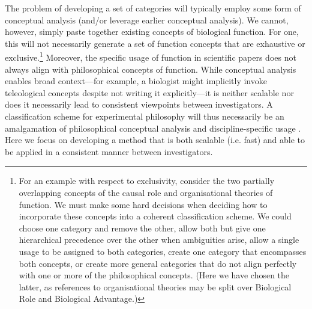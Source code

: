 \documentclass{article}
\begin{document}
The problem of developing a set of categories will typically employ some form of conceptual analysis (and/or leverage earlier conceptual analysis).
We cannot, however, simply paste together existing concepts of biological function.
For one, this will not necessarily generate a set of function concepts that are exhaustive or exclusive.\footnote{For an example with respect to exclusivity, consider the two partially overlapping concepts of the causal role \cite{cummins1975} and organisational theories \cite{mossio2009} of function. We must make some hard decisions when deciding how to incorporate these concepts into a coherent classification scheme. We could choose one category and remove the other, allow both but give one hierarchical precedence over the other when ambiguities arise, allow a single usage to be assigned to both categories, create one category that encompasses both concepts, or create more general categories that do not align perfectly with one or more of the philosophical concepts. (Here we have chosen the latter, as references to organisational theories may be split over Biological Role and Biological Advantage.)}
Moreover, the specific usage of function in scientific papers does not always align with philosophical concepts of function.
While conceptual analysis enables broad context---for example, a biologist might implicitly invoke teleological concepts despite not writing it explicitly---it is neither scalable nor does it necessarily lead to consistent viewpoints between investigators.
A classification scheme for experimental philosophy will thus necessarily be an amalgamation of philosophical conceptual analysis and discipline-specific usage \cite{wouters2003}.
Here we focus on developing a method that is both scalable (i.e. fast) and able to be applied in a consistent manner between investigators.
\end{document}
